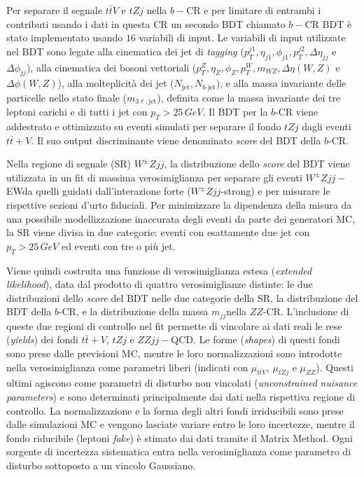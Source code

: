 \documentclass[11pt]{article}
\newcommand{\wzjjew}{$W^\pm Z jj-$ EW}
\newcommand{\wzjj}{$W^\pm Z jj$}
\newcommand{\mjj}{\ensuremath{m_{jj}}}
\begin{document}
Per separare il segnale $t\bar{t}V$ e $tZj$ nella $b-$CR e per limitare di entrambi i contributi usando i dati in questa CR un secondo BDT chiamato $b-$CR BDT è stato implementato usando $16$ variabili di input. Le variabili di input utilizzate nel BDT sono legate alla cinematica dei jet di \textit{tagging} ($p_T^{j1}, \eta_{j1}, \phi_{j1}, p_T^{j2}, \Delta\eta_{jj}$ e $\Delta\phi_{jj}$), alla cinematica dei bosoni vettoriali ($p_T^Z, \eta_Z, \phi_Z, p_T^W, m_{WZ}, \Delta\eta(W,Z)$ e $\Delta\phi(W,Z)$), alla molteplicità dei jet ($N_{\text{jet}}, N_{b\text{-jet}}$), e alla massa invariante delle particelle nello stato finale ($m_{3\ell,\text{jet}}$), definita come la massa invariante dei tre leptoni carichi e di tutti i jet con $p_T > 25\,\unit{GeV}$. 
Il BDT per la $b$-CR viene addestrato e ottimizzato su eventi simulati per separare il fondo $tZj$ dagli eventi $t\bar{t}+V$. Il suo output discriminante viene denominato \textit{score} del BDT della $b$-CR.

Nella regione di segnale (SR) $W^\pm Zjj$, la distribuzione dello \textit{score} del BDT viene utilizzata in un fit di massima verosimiglianza per separare gli eventi \wzjjew da quelli guidati dall'interazione forte (\wzjj-strong) e per misurare le rispettive sezioni d'urto fiduciali. Per minimizzare la dipendenza della misura da una possibile modellizzazione inaccurata degli eventi da parte dei generatori MC, la SR viene divisa in due categorie: eventi con esattamente due jet con $p_T > 25\,\unit{GeV}$ ed eventi con tre o più jet.

Viene quindi costruita una funzione di verosimiglianza estesa (\textit{extended likelihood}), data dal prodotto di quattro verosimiglianze distinte: le due distribuzioni dello \textit{score} del BDT nelle due categorie della SR, la distribuzione del BDT della $b$-CR, e la distribuzione della massa \mjj nella $ZZ$-CR. L'inclusione di queste due regioni di controllo nel fit permette di vincolare ai dati reali le rese (\textit{yields}) dei fondi $t\bar{t}+V$, $tZj$ e $ZZjj-$QCD. 
Le forme (\textit{shapes}) di questi fondi sono prese dalle previsioni MC, mentre le loro normalizzazioni sono introdotte nella verosimiglianza come parametri liberi (indicati con $\mu_{t\bar{t}V}$, $\mu_{tZj}$ e $\mu_{ZZ}$). Questi ultimi agiscono come parametri di disturbo non vincolati (\textit{unconstrained nuisance parameters}) e sono determinati principalmente dai dati nella rispettiva regione di controllo. La normalizzazione e la forma degli altri fondi irriducibili sono prese dalle simulazioni MC e vengono lasciate variare entro le loro incertezze, mentre il fondo riducibile (leptoni \textit{fake}) è stimato dai dati tramite il Matrix Method. Ogni sorgente di incertezza sistematica entra nella verosimiglianza come parametro di disturbo sottoposto a un vincolo Gaussiano.
\end{document}
